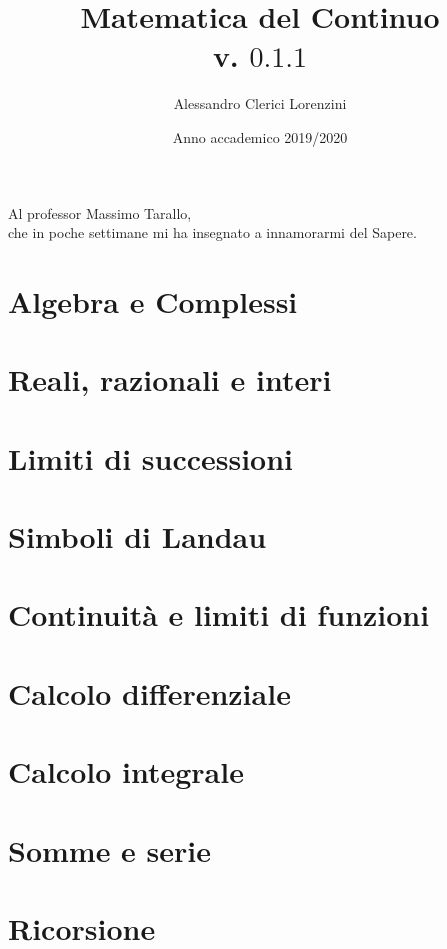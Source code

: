 \documentclass[a4paper,twoside]{report}
\begin{document}
\title{Matematica del Continuo\\
	\normalsize v. $0.1.1$ }
\author{Alessandro Clerici Lorenzini}
\date{Anno accademico 2019/2020}
\maketitle
\tableofcontents

\begin{dedication}
	Al professor Massimo Tarallo,\\
	che in poche settimane mi ha insegnato a innamorarmi del Sapere.
\end{dedication}


\chapter{Algebra e Complessi}




\chapter{Reali, razionali e interi}



\chapter{Limiti di successioni}



\chapter{Simboli di Landau}




\chapter{Continuità e limiti di funzioni}






\chapter{Calcolo differenziale}





\chapter{Calcolo integrale}




\chapter{Somme e serie}




\chapter{Ricorsione}

\end{document}
